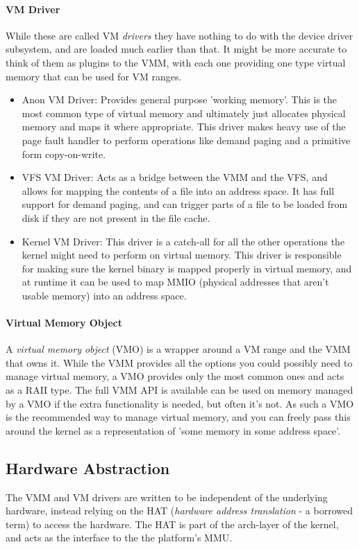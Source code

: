 \paragraph{VM Driver} 
\label{vmdrivers}
While these are called VM \textit{drivers} they have nothing to do with the device driver subsystem, and are loaded much earlier than that. It might be more accurate to think of them as plugins to the VMM, with each one providing one type virtual memory that can be used for VM ranges.

\begin{itemize}
    \item Anon VM Driver: Provides general purpose 'working memory'. This is the most common type of virtual memory and ultimately just allocates physical memory and maps it where appropriate. This driver makes heavy use of the page fault handler to perform operations like demand paging and a primitive form copy-on-write.
    \item VFS VM Driver: Acts as a bridge between the VMM and the VFS, and allows for mapping the contents of a file into an address space. It has full support for demand paging, and can trigger parts of a file to be loaded from disk if they are not present in the file cache.
    \item Kernel VM Driver: This driver is a catch-all for all the other operations the kernel might need to perform on virtual memory. This driver is responsible for making sure the kernel binary is mapped properly in virtual memory, and at runtime it can be used to map MMIO (physical addresses that aren't usable memory) into an address space.
\end{itemize}

\paragraph{Virtual Memory Object}
A \textit{virtual memory object} (VMO) is a wrapper around a VM range and the VMM that owns it. While the VMM provides all the options you could possibly need to manage virtual memory, a VMO provides only the most common ones and acts as a RAII type. The full VMM API is available can be used on memory managed by a VMO if the extra functionality is needed, but often it's not. As such a VMO is the recommended way to manage virtual memory, and you can freely pass this around the kernel as a representation of 'some memory in some address space'.

\subsection{Hardware Abstraction}
The VMM and VM drivers are written to be independent of the underlying hardware, instead relying on the HAT (\textit{hardware address translation} - a borrowed term) to access the hardware. The HAT is part of the arch-layer of the kernel, and acts as the interface to the the platform's MMU.

